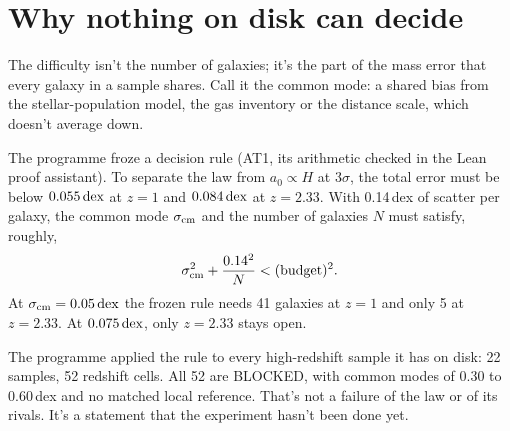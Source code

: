 


\section{Why nothing on disk can decide}

The difficulty isn't the number of galaxies; it's the part of the mass error that every galaxy in a sample shares. Call it the common mode: a shared bias from the stellar-population model, the gas inventory or the distance scale, which doesn't average down.


 The programme froze a decision rule (AT1, its arithmetic checked in the Lean proof assistant). To separate the law from $a_0\propto H$ at 3$\sigma$, the total error must be below $0.055\,\mathrm{dex}$ at $z=1$ and $0.084\,\mathrm{dex}$ at $z=2.33$. With 0.14\,dex of scatter per galaxy, the common mode $\sigma_{\rm cm}$ and the number of galaxies $N$ must satisfy, roughly,
\begin{equation}
\sigma_{\rm cm}^2+\frac{0.14^2}{N}<(\text{budget})^2.
\end{equation}
At $\sigma_{\rm cm}=0.05\,\mathrm{dex}$ the frozen rule needs 41 galaxies at $z=1$ and only 5 at $z=2.33$. At $0.075\,\mathrm{dex}$, only $z=2.33$ stays open.


The programme applied the rule to every high-redshift sample it has on disk: 22 samples, 52 redshift cells. All 52 are BLOCKED, with common modes of 0.30 to 0.60\,dex and no matched local reference. That's not a failure of the law or of its rivals. It's a statement that the experiment hasn't been done yet.

